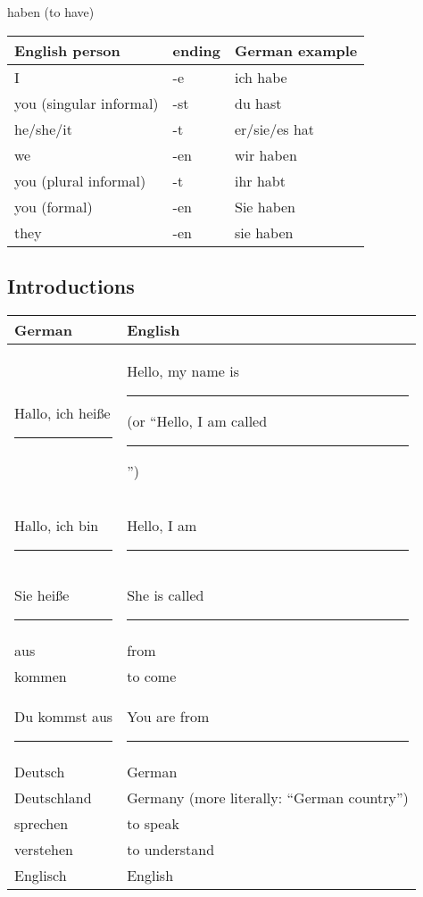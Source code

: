\begin{center}  haben (to have) \end{center}

\begin{center}\begin{tabular}{l|l|l}
  \textbf{English person} & \textbf{ending} & \textbf{German example} \\
	\hline
	I & -e & ich habe \\
	\hline
	you (singular informal) & -st & du hast \\
	\hline
	he/she/it & -t & er/sie/es hat \\
	\hline
	we & -en & wir haben \\
	\hline
	you (plural informal) & -t & ihr habt \\
	\hline
	you (formal) & -en & Sie haben \\
	\hline
	they & -en & sie haben \\
\end{tabular}\end{center}


\pagebreak
\subsection{Introductions}


\begin{center}\begin{tabular}{l|l}
  \textbf{German} & \textbf{English} \\
	\hline
	Hallo, ich hei{\ss}e \rule{1cm}{0.4pt} & Hello, my name is \rule{1cm}{0.4pt} (or ``Hello, I am called \rule{1cm}{0.4pt}'') \\
	Hallo, ich bin \rule{1cm}{0.4pt} & Hello, I am \rule{1cm}{0.4pt} \\
	Sie hei{\ss}e \rule{1cm}{0.4pt} & She is called \rule{1cm}{0.4pt} \\
	aus & from \\
	kommen & to come \\
	Du kommst aus \rule{1cm}{0.4pt} & You are from \rule{1cm}{0.4pt} \\
	Deutsch & German \\
	Deutschland & Germany (more literally:  ``German country'') \\
	sprechen & to speak \\
	verstehen & to understand \\
	Englisch & English \\
\end{tabular}\end{center}


